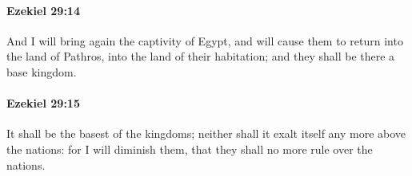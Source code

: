		\paragraph{Ezekiel 29:14} %
			\label{EZEKIEL-29-14}

			And I will bring again the captivity of Egypt, and will cause them to return into the land of Pathros, into the land of their habitation; and they shall be there a base kingdom.


		\paragraph{Ezekiel 29:15} %
			\label{EZEKIEL-29-15}

			It shall be the basest of the kingdoms; neither shall it exalt itself any more above the nations: for I will diminish them, that they shall no more rule over the nations.


